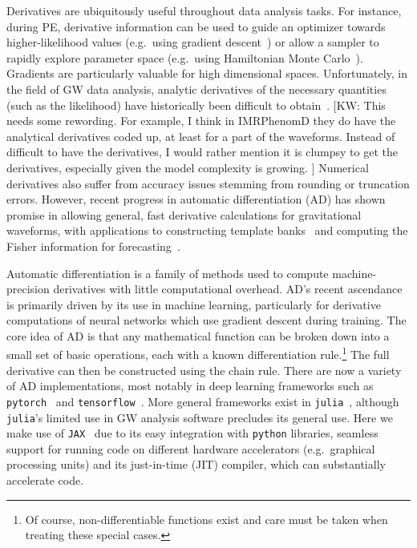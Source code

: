 \documentclass[twocolumn]{aastex631}
\newcommand{\jax}{\texttt{JAX}\xspace}
\newcommand{\kw}[1]{{\color{rb4}[KW: #1 ]}}
\newcommand{\dfm}[1]{{\color{dfm}[DFM: #1]}}
\begin{document}
Derivatives are ubiquitously useful throughout data analysis tasks.
For instance, during PE, derivative information can be used to guide an optimizer towards higher-likelihood values (e.g.\ using gradient descent~\citep{2016arXiv160904747R}) or allow a sampler to rapidly explore parameter space (e.g.\ using Hamiltonian Monte Carlo~\citep{2011hmcm.book..113N,2017arXiv170102434B}).
Gradients are particularly valuable for high dimensional spaces.
Unfortunately, in the field of GW data analysis, analytic derivatives of the necessary quantities (such as the likelihood) have historically been difficult to obtain~\citep{Keppel:2013kia}.
\kw{This needs some rewording. For example, I think in IMRPhenomD they do have the analytical derivatives coded up, at least for a part of the waveforms. Instead of difficult to have the derivatives, I would rather mention it is clumpsy to get the derivatives, especially given the model complexity is growing.}
Numerical derivatives also suffer from accuracy issues stemming from rounding or truncation errors.
However, recent progress in automatic differentiation (AD) has shown promise in allowing general, fast derivative calculations for gravitational waveforms, with applications to constructing template banks~\citep{Coogan:2022qxs} and computing the Fisher information for forecasting~\citep{Iacovelli:2022bbs, Iacovelli:2022mbg}.


Automatic differentiation is a family of methods used to compute machine-precision derivatives with little computational overhead. 
AD's recent ascendance is primarily driven by its use in machine learning, particularly for derivative computations of neural networks which use gradient descent during training.
The core idea of AD is that any mathematical function can be broken down into a small set of basic operations, each with a known differentiation rule.\footnote{
    Of course, non-differentiable functions exist and care must be taken when treating these special cases.
    }
The full derivative can then be constructed using the chain rule.
There are now a variety of AD implementations, most notably in deep learning frameworks such as \texttt{pytorch}~\citep{pytorch} and \texttt{tensorflow}~\citep{tensorflow2015-whitepaper}.
More general frameworks exist in \texttt{julia}~\citep{zygote, forwarddiff}, although \texttt{julia}'s limited use in GW analysis software precludes its general use.
Here we make use of \jax~\citep{jax2018github} due to its easy integration with \texttt{python} libraries, seamless support for running code on different hardware accelerators (e.g.\ graphical processing units) and its just-in-time (JIT) compiler, which can substantially accelerate code.
\end{document}

